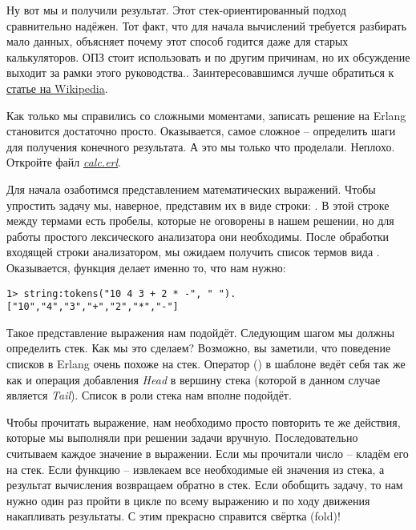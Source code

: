 Ну вот мы и получили результат.
Этот стек\--ориентированный подход сравнительно надёжен.
Тот факт, что для начала вычислений требуется разбирать мало данных, объясняет почему этот способ годится даже для старых калькуляторов.
ОПЗ стоит использовать и по другим причинам, но их обсуждение выходит за рамки этого руководства..
Заинтересовавшимся лучше обратиться к \href{http://en.wikipedia.org/wiki/Reverse_Polish_notation}{статье на Wikipedia}.

Как только мы справились со сложными моментами, записать решение на Erlang становится достаточно просто.
Оказывается, самое сложное \--- определить шаги для получения конечного результата.
А это мы только что проделали.
Неплохо.
Откройте файл \emph{\href{http://learnyousomeerlang.com/static/erlang/calc.erl}{calc.erl}}.

Для начала озаботимся представлением математических выражений.
Чтобы упростить задачу мы, наверное, представим их в виде строки: .
В этой строке между термами есть пробелы, которые не оговорены в нашем решении, но для работы простого лексического анализатора они необходимы.
После обработки входящей строки анализатором, мы ожидаем получить список термов вида \ops{[''10'',''4'',''3'',''+'',''2'',''*'',''-'']}.
Оказывается, функция  делает именно то, что нам нужно:
\begin{lstlisting}[style=erlang]
1> string:tokens("10 4 3 + 2 * -", " ").
["10","4","3","+","2","*","-"]
\end{lstlisting}

Такое представление выражения нам подойдёт.
Следующим шагом мы должны определить стек.
Как мы это сделаем?
Возможно, вы заметили, что поведение списков в Erlang очень похоже на стек.
Оператор (\ops{|}) в шаблоне  ведёт себя так же как и операция добавления \emph{Head} в вершину стека (которой в данном случае является \emph{Tail}).
Список в роли стека нам вполне подойдёт.

Чтобы прочитать выражение, нам необходимо просто повторить те же действия, которые мы выполняли при решении задачи вручную.
Последовательно считываем каждое значение в выражении.
Если мы прочитали число \--- кладём его на стек.
Если функцию \--- извлекаем все необходимые ей значения из стека, а результат вычисления возвращаем обратно в стек.
Если обобщить задачу, то нам нужно один раз пройти в цикле по всему выражению и по ходу движения накапливать результаты.
С этим прекрасно справится свёртка (fold)!

